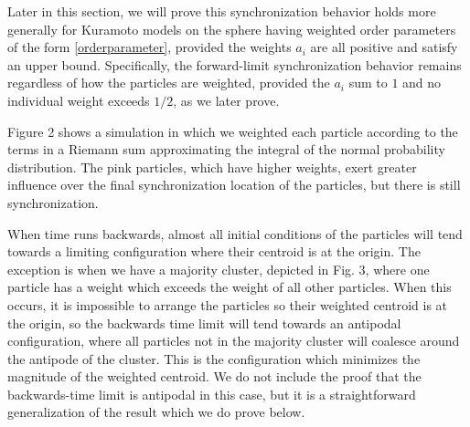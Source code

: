 \documentclass[%
 aip,
 amsmath,amssymb,
 reprint,%
]{revtex4-1}
\begin{document}
Later in this section, we will prove this synchronization behavior holds more generally for Kuramoto models on the sphere having weighted order parameters of the form \eqref{orderparameter}, provided the weights $a_i$ are all positive and satisfy an upper bound. Specifically, the forward-limit synchronization behavior remains regardless of how the particles are weighted, provided the $a_i$ sum to $1$ and no individual weight exceeds $1/2$, as we later prove. 

Figure 2 shows a simulation in which we weighted each particle according to the terms in a Riemann sum approximating the integral of the normal probability distribution. The pink particles, which have higher weights, exert greater influence over the final synchronization location of the particles, but there is still synchronization.

When time runs backwards, almost all initial conditions of the particles will tend towards a limiting configuration where their centroid is at the origin. The exception is when we have a majority cluster, depicted in Fig. 3, where one particle has a weight which exceeds the weight of all other particles. When this occurs, it is impossible to arrange the particles so their weighted centroid is at the origin, so the backwards time limit will tend towards an antipodal configuration, where all particles not in the majority cluster will coalesce around the antipode of the cluster. This is the configuration which minimizes the magnitude of the weighted centroid. We do not include the proof that the backwards-time limit is antipodal in this case, but it is a straightforward generalization of the result which we do prove below.
\end{document}

